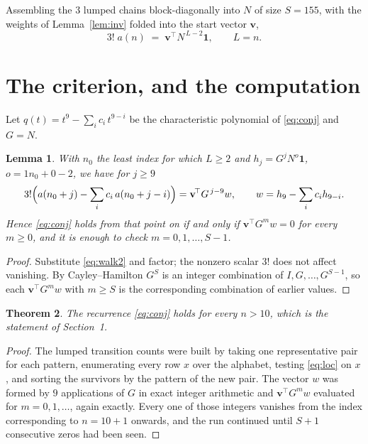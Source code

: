 \documentclass[11pt,a4paper]{article}
\theoremstyle{plain}
\newtheorem{theorem}{Theorem}
\newtheorem{lemma}[theorem]{Lemma}
\theoremstyle{definition}
\begin{document}
Assembling the $3$ lumped chains block-diagonally into $N$ of size $S=155$, with the
weights of Lemma~\ref{lem:inv} folded into the start vector $\mathbf{v}$,
\begin{equation}\label{eq:walk2}
3!\;a(n)\;=\;\mathbf{v}^{\!\top}N^{\,L-2}\mathbf{1},\qquad L=n .
\end{equation}

\section{The criterion, and the computation}

Let $q(t)=t^{9}-\sum_i c_i\,t^{9-i}$ be the characteristic polynomial of
\eqref{eq:conj} and $G=N$.

\begin{lemma}\label{lem:crit}
With $n_0$ the least index for which $L\ge2$ and $h_j=G^{j}N^{o}\mathbf{1}$,
$o=1n_0+0-2$, we have for $j\ge9$
\[
3!\Bigl(a(n_0+j)-\sum_i c_i\,a(n_0+j-i)\Bigr)
=\mathbf{v}^{\!\top}G^{\,j-9}w,\qquad
w=h_{9}-\sum_i c_i h_{9-i} .
\]
Hence \eqref{eq:conj} holds from that point on if and only if
$\mathbf{v}^{\!\top}G^{m}w=0$ for every $m\ge0$, and it is enough to check
$m=0,1,\dots,S-1$.
\end{lemma}

\begin{proof}
Substitute \eqref{eq:walk2} and factor; the nonzero scalar $3!$ does not affect
vanishing. By Cayley--Hamilton $G^{S}$ is an integer combination of $I,G,\dots,G^{S-1}$,
so each $\mathbf{v}^{\!\top}G^{m}w$ with $m\ge S$ is the corresponding combination of
earlier values.
\end{proof}

\begin{theorem}
The recurrence \eqref{eq:conj} holds for every $n>10$, which is the statement of
Section~1.
\end{theorem}

\begin{proof}
The lumped transition counts were built by taking one representative pair for each pattern,
enumerating every row $x$ over the alphabet, testing \eqref{eq:loc} on $x$, and sorting
the survivors by the pattern of the new pair. The vector $w$ was formed by $9$
applications of $G$ in exact integer arithmetic and $\mathbf{v}^{\!\top}G^{m}w$
evaluated for $m=0,1,\dots$, again exactly. Every one of those integers vanishes from the
index corresponding to $n=10+1$ onwards, and the run continued until $S+1$ consecutive
zeros had been seen.
\end{proof}
\end{document}
